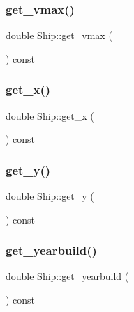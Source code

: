 \mbox{\label{class_ship_a18d96c836dffd4e9bb756014e0469bee}} 
\subsubsection{\texorpdfstring{get\_vmax()}{get\_vmax()}}
{\footnotesize\ttfamily double Ship\+::get\+\_\+vmax (\begin{DoxyParamCaption}{ }\end{DoxyParamCaption}) const}

\mbox{\label{class_ship_a3ae4ab1dee931dfe6e3b8ccedea54f8a}} 
\subsubsection{\texorpdfstring{get\_x()}{get\_x()}}
{\footnotesize\ttfamily double Ship\+::get\+\_\+x (\begin{DoxyParamCaption}{ }\end{DoxyParamCaption}) const}

\mbox{\label{class_ship_a7a60d5c792ede19acd19f487a1336568}} 
\subsubsection{\texorpdfstring{get\_y()}{get\_y()}}
{\footnotesize\ttfamily double Ship\+::get\+\_\+y (\begin{DoxyParamCaption}{ }\end{DoxyParamCaption}) const}

\mbox{\label{class_ship_add2c961edae22bc6590dde7289e158b8}} 
\subsubsection{\texorpdfstring{get\_yearbuild()}{get\_yearbuild()}}
{\footnotesize\ttfamily double Ship\+::get\+\_\+yearbuild (\begin{DoxyParamCaption}{ }\end{DoxyParamCaption}) const}

